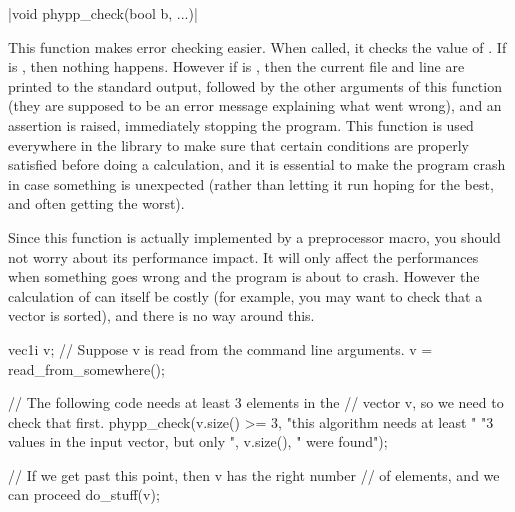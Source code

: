 \funcitem \cppinline|void phypp_check(bool b, ...)| 

This function makes error checking easier. When called, it checks the value of . If  is \cpptrue, then nothing happens. However if  is \cppfalse, then the current file and line are printed to the standard output, followed by the other arguments of this function (they are supposed to be an error message explaining what went wrong), and an assertion is raised, immediately stopping the program. This function is used everywhere in the \phypp library to make sure that certain conditions are properly satisfied before doing a calculation, and it is essential to make the program crash in case something is unexpected (rather than letting it run hoping for the best, and often getting the worst).

Since this function is actually implemented by a preprocessor macro, you should not worry about its performance impact. It will only affect the performances when something goes wrong and the program is about to crash. However the calculation of  can itself be costly (for example, you may want to check that a vector is sorted), and there is no way around this.

\begin{example}
\begin{cppcode}
vec1i v;
// Suppose v is read from the command line arguments.
v = read_from_somewhere();

// The following code needs at least 3 elements in the
// vector v, so we need to check that first.
phypp_check(v.size() >= 3, "this algorithm needs at least "
    "3 values in the input vector, but only ", v.size(),
    " were found");

// If we get past this point, then v has the right number
// of elements, and we can proceed
do_stuff(v);
\end{cppcode}
\end{example}
